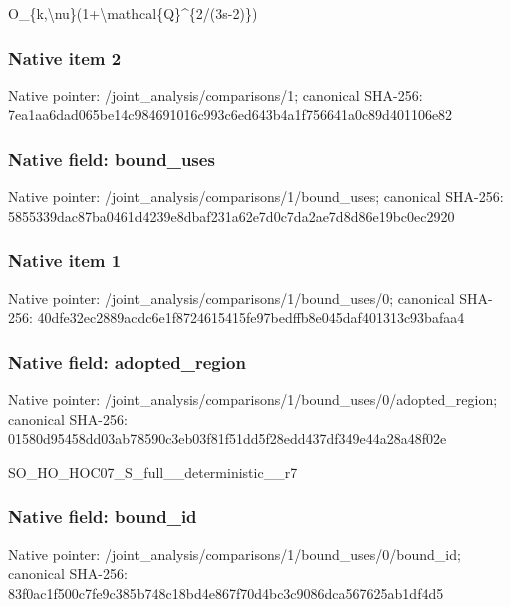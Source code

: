 \documentclass[10pt,a4paper]{article}
\begin{document}
\begingroup\raggedright\sloppy O\_\allowbreak{}\{k,\allowbreak{}\textbackslash{}nu\}(1+\textbackslash{}mathcal\{Q\}\textasciicircum{}\{2/\allowbreak{}(3s-2)\})\par\endgroup

\subsubsection{Native item 2}
Native pointer: /joint\_\allowbreak{}analysis/comparisons/1; canonical SHA-256: 7ea1aa6dad065be14c984691016c993c6ed643b4a1f756641a0c89d401106e82

\subsubsection{Native field: bound\_\allowbreak{}uses}
Native pointer: /joint\_\allowbreak{}analysis/comparisons/1/bound\_\allowbreak{}uses; canonical SHA-256: 5855339dac87ba0461d4239e8dbaf231a62e7d0c7da2ae7d8d86e19bc0ec2920

\subsubsection{Native item 1}
Native pointer: /joint\_\allowbreak{}analysis/comparisons/1/bound\_\allowbreak{}uses/0; canonical SHA-256: 40dfe32ec2889acdc6e1f8724615415fe97bedffb8e045daf401313c93bafaa4

\subsubsection{Native field: adopted\_\allowbreak{}region}
Native pointer: /joint\_\allowbreak{}analysis/comparisons/1/bound\_\allowbreak{}uses/0/adopted\_\allowbreak{}region; canonical SHA-256: 01580d95458dd03ab78590c3eb03f81f51dd5f28edd437df349e44a28a48f02e

\begingroup\raggedright\sloppy SO\_\allowbreak{}HO\_\allowbreak{}HOC07\_\allowbreak{}S\_\allowbreak{}full\_\allowbreak{}\_\allowbreak{}deterministic\_\allowbreak{}\_\allowbreak{}r7\par\endgroup

\subsubsection{Native field: bound\_\allowbreak{}id}
Native pointer: /joint\_\allowbreak{}analysis/comparisons/1/bound\_\allowbreak{}uses/0/bound\_\allowbreak{}id; canonical SHA-256: 83f0ac1f500c7fe9c385b748c18bd4e867f70d4bc3c9086dca567625ab1df4d5
\end{document}
